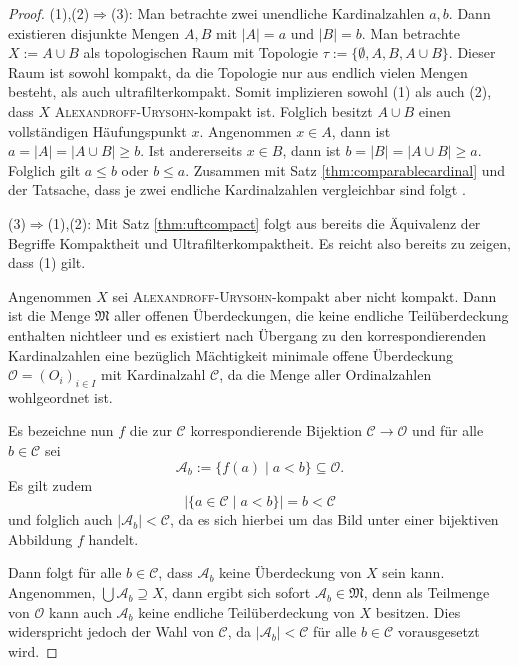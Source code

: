 \begin{proof}
  (1),(2)$\Rightarrow$(3):
  Man betrachte zwei unendliche Kardinalzahlen $a,b$.
  Dann existieren disjunkte Mengen $A,B$ mit $|A| = a$ und $|B| = b$.
  Man betrachte $X := A \cup B$ als topologischen Raum mit Topologie $\tau := \{\emptyset, A, B, A \cup B\}$.
  Dieser Raum ist sowohl kompakt, da die Topologie nur aus endlich vielen Mengen besteht, als auch ultrafilterkompakt. 
  Somit implizieren sowohl (1) als auch (2), dass $X$ \textsc{Alexandroff}-\textsc{Urysohn}-kompakt ist.
  Folglich besitzt $A \cup B$ einen vollständigen Häufungspunkt $x$.
  Angenommen $x \in A$, dann ist $a = |A| = |A \cup B| \geq b$. 
  Ist andererseits $x \in B$, dann ist $b = |B| = |A \cup B| \geq a$.
  Folglich gilt $a \leq b$ oder $b \leq a$.
  Zusammen mit Satz \ref{thm:comparablecardinal} und der Tatsache, dass je zwei endliche Kardinalzahlen vergleichbar sind folgt \AC.

  (3)$\Rightarrow$(1),(2):
  Mit Satz \ref{thm:uftcompact} folgt aus \UFT bereits die Äquivalenz der Begriffe Kompaktheit und Ultrafilterkompaktheit.
  Es reicht also bereits zu zeigen, dass (1) gilt.

  Angenommen $X$ sei \textsc{Alexandroff}-\textsc{Urysohn}-kompakt aber nicht kompakt.
  Dann ist die Menge $\mathfrak{M}$ aller offenen Überdeckungen, die keine endliche Teilüberdeckung enthalten nichtleer und es existiert nach Übergang zu den korrespondierenden Kardinalzahlen eine bezüglich Mächtigkeit minimale offene Überdeckung $\mathcal{O} = (O_i)_{i \in I}$ mit Kardinalzahl $\mathcal{C}$, da die Menge aller Ordinalzahlen wohlgeordnet ist.

  Es bezeichne nun $f$ die zur $\mathcal{C}$ korrespondierende Bijektion $\mathcal{C} \to \mathcal{O}$ und für alle $b \in \mathcal{C}$ sei 
  \begin{displaymath}
    \mathcal{A}_b := \{ f(a) \mid a < b\} \subseteq \mathcal{O}.
  \end{displaymath}
  Es gilt zudem
  \begin{displaymath}
    | \{ a \in \mathcal{C} \mid a < b \} | = b < \mathcal{C}
  \end{displaymath}
  und folglich auch $| \mathcal{A}_b | < \mathcal{C}$, da es sich hierbei um das Bild unter einer bijektiven Abbildung $f$ handelt.

  Dann folgt für alle $b \in \mathcal{C}$, dass $\mathcal{A}_b$ keine Überdeckung von $X$ sein kann.
  Angenommen, $\bigcup \mathcal{A}_b \supseteq X$, dann ergibt sich sofort $\mathcal{A}_b \in \mathfrak{M}$, denn als Teilmenge von $\mathcal{O}$ kann auch $\mathcal{A}_b$ keine endliche Teilüberdeckung von $X$ besitzen.
  Dies widerspricht jedoch der Wahl von $\mathcal{C}$, da $|\mathcal{A}_b| < \mathcal{C}$ für alle $b \in \mathcal{C}$ vorausgesetzt wird.


\end{proof}
